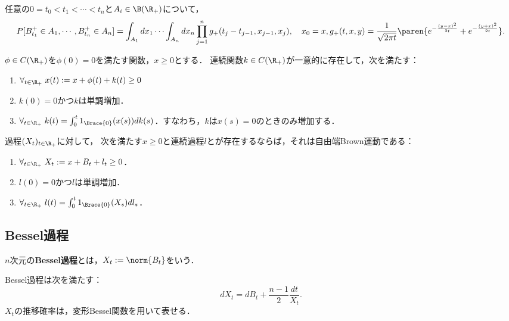\documentclass[uplatex,dvipdfmx]{jsreport}
\begin{document}
\begin{lemma}[自由端Brown運動の遷移確率]
    任意の$0=t_0<t_1<\cdots<t_n$と$A_i\in\B(\R_+)$について，
    \[P[B^+_{t_1}\in A_1,\cdots,B^+_{t_n}\in A_n]=\int_{A_1}dx_1\cdots\int_{A_n}dx_n\prod^n_{j=1}g_+(t_j-t_{j-1},x_{j-1},x_j),\quad x_0=x,g_+(t,x,y)=\frac{1}{\sqrt{2\pi t}}\paren{e^{-\frac{(y-x)^2}{2t}}+e^{-\frac{(y+x)^2}{2t}}}.\]
\end{lemma}

\begin{lemma}
    $\phi\in C(\R_+)$を$\phi(0)=0$を満たす関数，$x\ge0$とする．
    連続関数$k\in C(\R_+)$が一意的に存在して，次を満たす：
    \begin{enumerate}
        \item $\forall_{t\in\R_+}\;x(t):=x+\phi(t)+k(t)\ge0$
        \item $k(0)=0$かつ$k$は単調増加．
        \item $\forall_{t\in\R_+}\;k(t)=\int^t_01_{\Brace{0}}(x(s))dk(s)$．すなわち，$k$は$x(s)=0$のときのみ増加する．
    \end{enumerate}
\end{lemma}

\begin{theorem}
    過程$(X_t)_{t\in\R_+}$に対して，
    次を満たす$x\ge0$と連続過程$l$とが存在するならば，それは自由端Brown運動である：
    \begin{enumerate}
        \item $\forall_{t\in\R_+}\;X_t:=x+B_t+l_t\ge0$．
        \item $l(0)=0$かつ$l$は単調増加．
        \item $\forall_{t\in\R_+}\;l(t)=\int^t_01_{\Brace{0}}(X_s)dl_s$．
    \end{enumerate}
\end{theorem}

\subsection{Bessel過程}

\begin{definition}
    $n$次元の\textbf{Bessel過程}とは，$X_t:=\norm{B_t}$をいう．
\end{definition}
\begin{proposition}
    Bessel過程は次を満たす：
    \[dX_t=dB_t+\frac{n-1}{2}\frac{dt}{X_t}.\]
    $X_t$の推移確率は，変形Bessel関数を用いて表せる．
\end{proposition}
\end{document}
